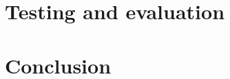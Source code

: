 \documentclass[oribibl]{llncs}
\begin{document}










\newpage
\section{Testing and evaluation}









\section{Conclusion}







%
\end{document}
